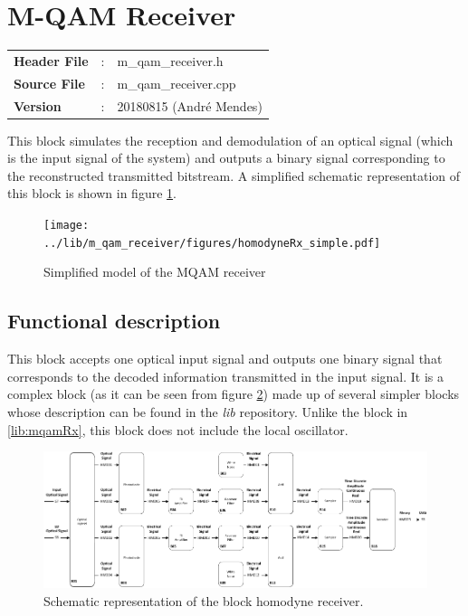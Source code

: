 \clearpage

\section{M-QAM Receiver}\label{lib:homodyneRx}

\begin{tcolorbox}	
	\begin{tabular}{p{2.75cm} p{0.2cm} p{10.5cm}} 	
		\textbf{Header File}   &:& m\_qam\_receiver.h \\
		\textbf{Source File}   &:& m\_qam\_receiver.cpp \\
        \textbf{Version}       &:& 20180815 (Andr\'e Mendes)\\
	\end{tabular}
\end{tcolorbox}

This block simulates the reception and demodulation of an optical
signal (which is the input signal of the system) and outputs a binary signal
corresponding to the reconstructed transmitted bitstream.
 A simplified schematic representation of this block is shown in
figure
\ref{fig:homodyneRx_simple}.

\begin{figure}[h]
	\centering
	\texttt{[image: ../lib/m\_qam\_receiver/figures/homodyneRx\_simple.pdf]}
	\caption{Simplified model of the MQAM receiver}\label{fig:homodyneRx_simple}
\end{figure}

\subsection*{Functional description}

This block accepts one optical input signal and outputs one binary signal that
corresponds to the decoded information transmitted in the input signal. It is a
complex
block (as it can be seen from figure \ref{fig:homodyneRx_blocks}) made up of
several simpler blocks whose description can be found in the
\textit{lib} repository. Unlike the block in \ref{lib:mqamRx}, this block does
not include the local oscillator.

\begin{figure}[h]
	\centering
	\includegraphics[width=\textwidth]{../lib/m_qam_receiver/figures/homodyneRx_blocks.pdf}
	\caption{Schematic representation of the block homodyne
	receiver.}\label{fig:homodyneRx_blocks}
\end{figure}

